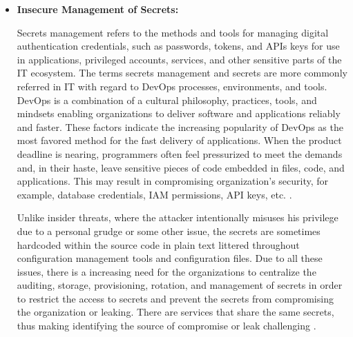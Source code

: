 \begin{itemize}
    \item \textbf{Insecure Management of Secrets:} \par Secrets management refers to the methods and tools for managing digital authentication credentials, such as passwords, tokens, and APIs keys for use in applications, privileged accounts, services, and other sensitive parts of the IT ecosystem.
    The terms secrets management and secrets are more commonly referred in IT with regard to DevOps processes, environments, and tools.
    DevOps is a combination of a cultural philosophy,
    practices, tools, and mindsets enabling organizations to deliver software and applications reliably and faster.
    These factors indicate the increasing popularity of DevOps as the most favored method for the fast delivery of applications.
    When the product deadline is nearing, programmers
    often feel pressurized to meet the demands and, in
    their haste, leave sensitive pieces of code embedded
    in files, code, and applications.
    This may result in compromising organization’s
    security, for example, database credentials, IAM permissions, API keys, etc. \cite{70}.

    Unlike insider threats, where the attacker intentionally misuses his privilege due to a personal grudge or some
    other issue, the secrets are sometimes hardcoded
    within the source code in plain text littered throughout configuration management tools and configuration files.
    Due to all these issues, there is a increasing  need
    for the organizations to centralize the auditing,
    storage, provisioning, rotation, and management of
    secrets in order to restrict the access to secrets
    and prevent the secrets from compromising the organization or leaking.
    There are services that share the same secrets, thus making identifying the source of compromise or leak challenging \cite{70}.
\end{itemize}

